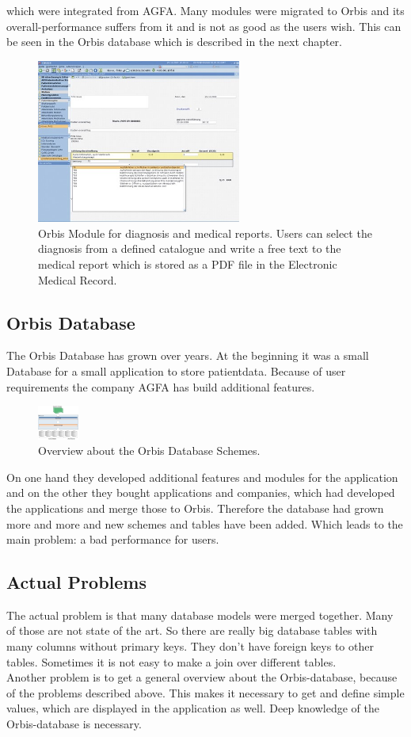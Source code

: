 \documentclass[a4paper]{article}
\begin{document}
	which were integrated from AGFA. Many modules were migrated to Orbis and
	its overall-performance suffers from it and is not as good as the users wish.
	This can be seen in the Orbis database which is described in the next chapter.\\
	\begin{figure}[!ht]
		  \centering
		      \includegraphics[width=0.6\textwidth]{orbis2}
		  \caption{Orbis Module for diagnosis and medical reports. Users can
		  select the diagnosis from a defined catalogue and write a free text to the
		  medical report which is stored as a PDF file in the Electronic Medical
		  Record.}
	\end{figure}
	\subsection{Orbis Database}
	The Orbis Database has grown over years. At the beginning it was a small
	Database for a small application to store patientdata. Because of user
	requirements the company AGFA has build additional features. \\
	\begin{figure}[!ht]
		  \centering
		      \includegraphics[width=0.12\textwidth]{orbis_db_schema}
		  \caption{Overview about the Orbis Database Schemes.}
	\end{figure}
	On one hand they developed additional features and modules for the application
	and on the other they bought applications and companies, which had developed
	the applications and merge those to Orbis. Therefore the database had grown
	more and more and new schemes and tables have been added. Which leads to the
	main problem: a bad performance for users.
	\subsection{Actual Problems}
	The actual problem is that many database models were merged together. Many of
	those are not state of the art. So there are really big database tables with
	many columns without primary keys. They don't have foreign keys to
	other tables. Sometimes it is not easy to make a join over different tables.\\
	Another problem is to get a general overview about the Orbis-database, because
	of the problems described above. This makes it necessary to get and define simple values, which are displayed in the application as well. Deep
	knowledge of the Orbis-database is necessary.
\end{document}
